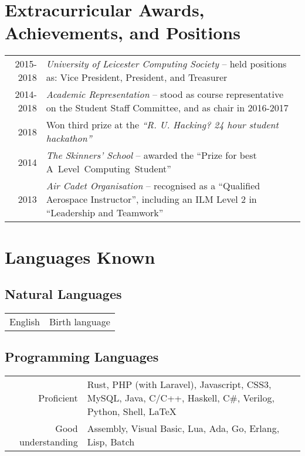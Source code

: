 \documentclass[a4paper]{article}
\begin{document}
\section*{Extracurricular Awards, Achievements, and Positions}
\begin{tabular}{rp{11.75cm}}
  2015-2018 & \emph{University of Leicester Computing Society} -- held positions as: Vice President, President, and Treasurer \\
  2014-2018 & \emph{Academic Representation} -- stood as course representative on the Student Staff Committee, and as chair in 2016-2017 \\
  2018 & Won third prize at the \emph{``R. U. Hacking? 24 hour student hackathon''} \\
  2014 & \emph{The Skinners' School} -- awarded the ``Prize for best A~Level~Computing~Student'' \\
  2013 & \emph{Air Cadet Organisation} -- recognised as a ``Qualified Aerospace Instructor'', including an ILM Level 2 in ``Leadership and Teamwork''
\end{tabular}

\section*{Languages Known}
\subsection*{Natural Languages}
\begin{tabular}{rl}
  English & Birth language
\end{tabular}
\subsection*{Programming Languages}
\begin{tabular}{r|p{9cm}}
  Proficient & Rust, PHP (with Laravel), Javascript, CSS3, MySQL, Java, C/C++, Haskell, C\#, Verilog, Python, Shell, LaTeX \\
  Good understanding & Assembly, Visual Basic, Lua, Ada, Go, Erlang, Lisp, Batch
\end{tabular}
\end{document}
